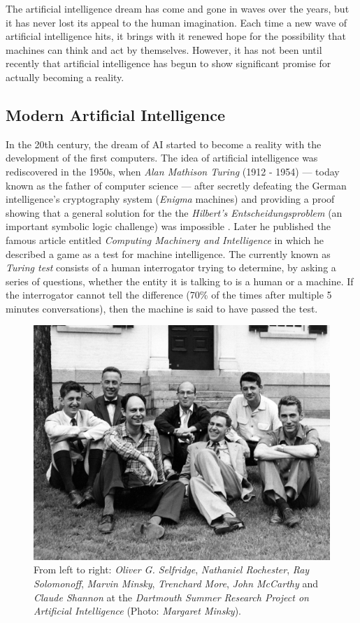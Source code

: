 The artificial intelligence dream has come and gone in waves over the years, but it has never lost its appeal to the human imagination. Each time a new wave of artificial intelligence hits, it brings with it renewed hope for the possibility that machines can think and act by themselves. However, it has not been until recently that artificial intelligence has begun to show significant promise for actually becoming a reality.

\subsection{Modern Artificial Intelligence}
In the 20th century, the dream of AI started to become a reality with the development of the first computers. The idea of artificial intelligence was rediscovered in the 1950s, when \textit{Alan Mathison Turing} (1912 - 1954) — today known as the father of computer science — after secretly defeating the German intelligence's cryptography system (\textit{Enigma} machines) \autocite{Hodges:2000} and providing a proof showing that a general solution for the the \textit{Hilbert's Entscheidungsproblem} (an important symbolic logic challenge) was impossible \autocite{turing1936}. Later he published the famous article entitled \textit{Computing Machinery and Intelligence} \autocite{turing1950} in which he described a game as a test for machine intelligence. The currently known as \textit{Turing test} consists of a human interrogator trying to determine, by asking a series of questions, whether the entity it is talking to is a human or a machine. If the interrogator cannot tell the difference (70\% of the times after multiple 5 minutes conversations), then the machine is said to have passed the test.

\begin{figure}[h!]
	\centering
	\includegraphics[width=.6\textwidth]{introduction/images/dartmouth}
	\caption{From left to right: \textit{Oliver G. Selfridge}, \textit{Nathaniel Rochester}, \textit{Ray Solomonoff}, \textit{Marvin Minsky}, \textit{Trenchard More}, \textit{John McCarthy} and \textit{Claude Shannon} at the \textit{Dartmouth Summer Research Project on Artificial Intelligence} (Photo: \textit{Margaret Minsky}).}
	\label{fig:dartmouth_photo}
\end{figure}

